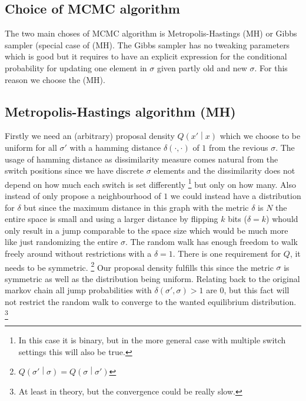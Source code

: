 \documentclass[a4paper,11pt]{kth-mag}
\begin{document}
            \subsection{Choice of MCMC algorithm}
                The two main choses of MCMC algorithm is Metropolis-Hastings (MH) 
                or Gibbs sampler (special case of (MH).
                The Gibbs sampler has no tweaking parameters which is good but it 
                requires to have an explicit expression for the conditional 
                probability for updating one element in $\sigma$ given partly 
                old and new $\sigma$. For this reason we choose the (MH).
                
            \subsection{Metropolis-Hastings algorithm (MH)}
                Firstly we need an (arbitrary) proposal density $Q\left(x'\middle\vert x\right)$
                which we choose to be uniform for all $\sigma'$ 
                with a hamming distance $\delta\left(\cdot,\cdot\right)$ 
                of $1$ from the revious $\sigma$.
                The usage of hamming distance as dissimilarity measure comes natural 
                from the switch positions since we have discrete $\sigma$ elements 
                and the dissimilarity does not depend on how much each switch is set 
                differently
                \footnote{In this case it is binary, but in the more general case with 
                multiple switch settings this will also be true.} 
                but only on how many.
                Also instead of only propose a neighbourhood of $1$ we could instead have a
                distribution for $\delta$ but since the maximum distance in this graph 
                with the metric $\delta$ is $N$ the entire space is small and using a 
                larger distance by flipping $k$ bits ($\delta=k$) whould only result in a jump 
                comparable to the space size which would be much more like 
                just randomizing the entire $\sigma$. The random walk has enough freedom to 
                walk freely around without restrictions with a $\delta=1$.
                There is one requirement for $Q$, it needs to be symmetric.
                \footnote{$Q\left(\sigma' \middle\vert \sigma\right)
                =Q\left(\sigma \middle\vert \sigma'\right) $}
                Our proposal density fulfills this since the metric $\sigma$ is symmetric 
                as well as the distribution being uniform.
                Relating back to the original markov chain all jump probabilities with 
                $\delta(\sigma',\sigma)>1$ are $0$, but this fact will not restrict the random
                walk to converge to the wanted equilibrium distribution.
                \footnote{At least in theory, but the convergence could be really slow.}
         
\end{document}

